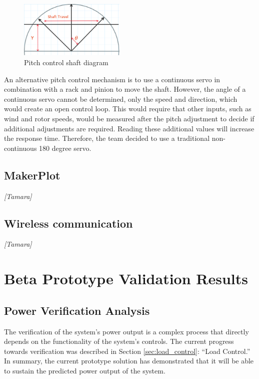 \documentclass[11pt,letterpaper,conference]{IEEEtran}
\begin{document}
\begin{figure}[th]
    \centering
    \includegraphics[width=0.45\textwidth]{images/pitch_control.png}
    \caption{Pitch control shaft diagram}
    \label{img:pitch_control}
\end{figure}

An alternative pitch control mechanism is to use a continuous servo in
combination with a rack and pinion to move the shaft. However, the angle of a
continuous servo cannot be determined, only the speed and direction, which
would create an open control loop. This would require that other inputs, such
as wind and rotor speeds, would be measured after the pitch adjustment to
decide if additional adjustments are required. Reading these additional values
will increase the response time. Therefore, the team decided to use a
traditional non-continuous 180 degree servo.

\subsection{MakerPlot}

\emph{[Tamara]}

\subsection{Wireless communication}

\emph{[Tamara]}

\section{Beta Prototype Validation Results}
\subsection{Power Verification Analysis}

The verification of the system's power output is a complex process that
directly depends on the functionality of the system's controls. The current
progress towards verification was described in Section \ref{sec:load_control}:
``Load Control.'' In summary, the current prototype solution has demonstrated
that it will be able to sustain the predicted power output of the system.
\end{document}
